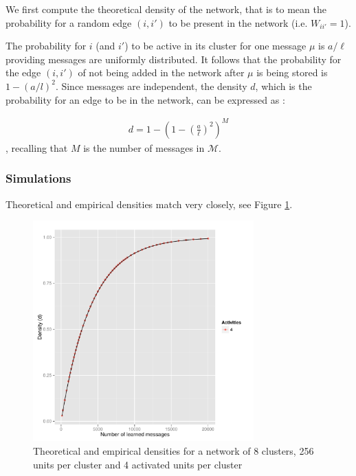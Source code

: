 \documentclass[english,10pt,twocolumn]{IEEEtran}
\theoremstyle{definition}
\begin{document}
	We first compute the theoretical density of the network, that is to mean the probability for a random edge $(i, i')$ to be present in the network (i.e. $W_{ii'} = 1$). 
	
	
	
	
	
	
	
	
	

	
	
	The probability for $i$ (and $i'$) to be active in its cluster for one message $\mu$ is $a/\ell$ providing messages are uniformly distributed. It follows that the probability for the edge $(i,i')$ of not being added in the network after $\mu$ is being stored is $1 - \left(a/l\right)^2$. Since messages are independent, the density $d$, which is the probability for an edge to be in the network, can be expressed as :
	
	\begin{align}
		\label{formula_density}
		d = 1 - \left( 1 - \left(\frac{a}{\ell}\right)^2 \right)^M 
	\end{align}		
	, recalling that $M$ is the number of messages in $\mathcal{M}$.	
	
	\subsubsection{Simulations}
	
	Theoretical and empirical densities match very closely, see Figure \ref{densiteth}. %
	\begin{figure}[!htb]
		\includegraphics[width=8.5cm]{Courbes/remplacement_densite_c8l256a4}
		\caption{Theoretical and empirical densities for a network of 8 clusters, 256 units per cluster and 4 activated units per cluster}
			\label{densiteth}
	\end{figure}	
	
\end{document}
